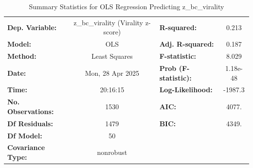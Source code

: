 \documentclass[12pt,a4paper]{report}
\begin{document}
\begin{table}
    \centering
    \captionsetup{justification=centering}
    \caption{Summary Statistics for OLS Regression Predicting z\_bc\_virality}
    \label{tab:ols_virality_summary}
    \scriptsize %
    \setlength{\tabcolsep}{3pt} %

    \begin{tabular}{lclc}
        \toprule
        \textbf{Dep. Variable:}     & z\_bc\_virality (Virality z-score) & \textbf{R-squared:}         & 0.213   \\
        \textbf{Model:}             & OLS                                & \textbf{Adj. R-squared:}    & 0.187   \\
        \textbf{Method:}            & Least Squares                      & \textbf{F-statistic:}       & 8.029   \\
        \textbf{Date:}              & Mon, 28 Apr 2025                   & \textbf{Prob (F-statistic):} & 1.18e-48 \\
        \textbf{Time:}              & 20:16:15                           & \textbf{Log-Likelihood:}    & -1987.3 \\
        \textbf{No. Observations:}  & 1530                               & \textbf{AIC:}               & 4077.   \\
        \textbf{Df Residuals:}      & 1479                               & \textbf{BIC:}               & 4349.   \\
        \textbf{Df Model:}          & 50                                 & \textbf{}                   &         \\
        \textbf{Covariance Type:}   & nonrobust                          & \textbf{}                   &         \\
        \bottomrule
    \end{tabular}
\end{table}
\end{document}
